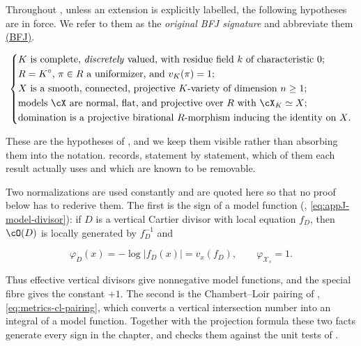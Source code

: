 Throughout , unless an
extension is explicitly labelled, the following hypotheses are in force.  We
refer to them as the \emph{original BFJ signature} and abbreviate them
\hyperref[eq:ch20-standing]{\textup{(BFJ)}}.

\begin{equation}
\label{eq:ch20-standing}
\left\{
\begin{aligned}
 &\text{\(K\) is complete, \emph{discretely} valued, with residue field
   \(k\) of characteristic \(0\);}\\
 &\text{\(R=K^\circ\), \(\pi\in R\) a uniformizer, and \(v_K(\pi)=1\);}\\
 &\text{\(X\) is a smooth, connected, projective \(K\)-variety of dimension
   \(n\geq1\);}\\
 &\text{models \(\cX\) are normal, flat, and projective over \(R\) with
   \(\cX_K\simeq X\);}\\
 &\text{domination is a projective birational \(R\)-morphism inducing the
   identity on \(X\).}
\end{aligned}
\right.
\end{equation}

These are the hypotheses of \cite{BFJ16}, and we keep them visible rather
than absorbing them into the notation.   records, statement by statement, which of
them each result actually uses and which are known to be removable.

Two normalizations are used constantly and are quoted here so that no proof
below has to rederive them.  The first is the sign of a model function
(, \eqref{eq:appJ-model-divisor}):
if \(D\) is a vertical Cartier divisor with local equation \(f_D\), then
\(\cO(D)\) is locally generated by \(f_D^{-1}\) and

\begin{equation}
\label{eq:ch20-sign}
              \varphi_D(x)=-\log|f_D(x)|=v_x(f_D),
              \qquad \varphi_{\mathcal X_s}=1.
\end{equation}

Thus effective vertical divisors give nonnegative model functions, and the
special fibre gives the constant \(+1\).  The second is the
Chambert--Loir pairing of ,
\eqref{eq:metrics-cl-pairing}, which converts a vertical intersection number
into an integral of a model function.  Together with the projection formula
 these two facts generate every sign in
the chapter, and  checks them against the
unit tests of .

